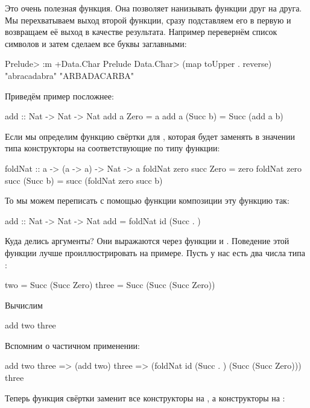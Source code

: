 Это очень полезная функция. Она позволяет нанизывать
функции друг на друга. Мы перехватываем выход второй функции,
сразу подставляем его в первую и возвращаем её выход в качестве
результата. Например перевернём список символов и затем 
сделаем все буквы заглавными:

\begin{code}
Prelude> :m +Data.Char
Prelude Data.Char> (map toUpper . reverse) "abracadabra"
"ARBADACARBA"
\end{code}

Приведём пример посложнее:

\begin{code}
add :: Nat -> Nat -> Nat
add  a  Zero     = a
add  a  (Succ b) = Succ (add a b)
\end{code}

Если мы определим функцию свёртки для , которая
будет заменять в значении типа  конструкторы на 
соответствующие по типу функции:

\begin{code}
foldNat :: a -> (a -> a) -> Nat -> a
foldNat zero succ Zero     = zero
foldNat zero succ (Succ b) = succ (foldNat zero succ b)
\end{code}

То мы можем переписать с помощью функции композиции эту функцию так:

\begin{code}
add :: Nat -> Nat -> Nat
add = foldNat  id  (Succ . )
\end{code}

Куда делись аргументы? Они выражаются через функции 
и . Поведение этой функции лучше проиллюстрировать 
на примере. Пусть у нас есть два числа типа :

\begin{code}
two     = Succ (Succ Zero)
three   = Succ (Succ (Succ Zero))
\end{code}

Вычислим 

\begin{code}
add two three
\end{code}

Вспомним о частичном применении:

\begin{code}
    add two three 
=>  (add two) three
=>  (foldNat id (Succ . ) (Succ (Succ Zero))) three
\end{code}

Теперь функция свёртки заменит все конструкторы  
на , а конструкторы  на :

